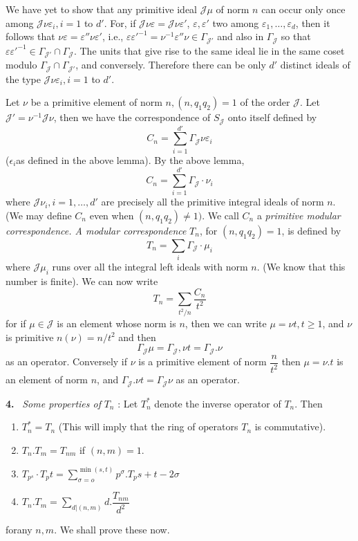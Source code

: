 We have yet to show that any primitive ideal $\mathcal{J} \mu$ of norm
$n$ can occur only once among $\mathcal{J} \nu \varepsilon_i, i = 1$
to $d'$. For, if $\mathcal{J} \nu \varepsilon = \mathcal{J} \nu
\varepsilon'$, $\varepsilon, \varepsilon'$ two among $\varepsilon_1,
\ldots,  \varepsilon_d$, then it follows that $\nu \varepsilon =
\varepsilon'' \nu \varepsilon'$, i.e., $\varepsilon \varepsilon'^{-1} =
\nu^{-1} \varepsilon'' \nu \in \Gamma_{\mathcal{J}'}$ and also in
$\Gamma_{\mathcal{J}}$ so that $\varepsilon \varepsilon'^{-1} \in
\Gamma_{\mathcal{J}'} \cap \Gamma_{\mathcal{J}}$. The units that give
rise to the same ideal lie in the same coset modulo $\Gamma_{\mathcal{J}} \cap
\Gamma_{\mathcal{J}'}$, and conversely. Therefore there can be only
$d'$ distinct ideals of the type $\mathcal{J} \nu \varepsilon_i, i =
1$ to $d'$. 

Let $\nu$ be a primitive element of norm $n, (n, q_1 q_2) = 1$ of the
order $\mathcal{J}$. Let $\mathcal{J}' = \nu^{-1} \mathcal{J} \nu$,
then we have the correspondence of $S_\mathcal{J}$ onto itself defined
by 
$$
C_n = \sum^{d'}_{i = 1} \Gamma_\mathcal{J} \nu \varepsilon_i
$$
($\epsilon_i$\pageoriginale as defined in the above lemma). By the above lemma,
$$
C_n = \sum^{d'}_{i = 1} \Gamma_\mathcal{J} \cdot \nu_i
$$
where $\mathcal{J} \nu_i, i=1, \ldots,  d'$ are precisely all the
primitive integral ideals of norm $n$. (We may define $C_n$ even when
$(n, q_1 q_2) \neq 1)$. We call $C_n$ a\textit{ primitive modular
  correspondence. A modular correspondence} $T_n$, for $(n, q_1 q_2) =
1$, is defined by 
$$
T_n = \sum_{i} \Gamma_{\mathcal{J}} \cdot \mu_i
$$
where $\mathcal{J} \mu_i$ runs over all the integral left ideals with
norm $n$. (We know that this number is finite). We can now write 
$$
T_n = \sum_{t^2 / n} \frac{C_n}{t^2}
$$
for if $\mu \in \mathcal{J} $ is an element whose norm is $n$, then we
can write $\mu = \nu t, t \ge 1$, and $\nu$ is primitive $n (\nu) = n/
t^2$ and then  
$$
\Gamma_{\mathcal{J}} \mu = \Gamma_{\mathcal{J}}, \nu t = \Gamma_{\mathcal{J}}. \nu
$$
as an operator. Conversely if $\nu$ is a primitive element of norm
$\dfrac{n}{t^2}$ then $\mu = \nu.  t$ is an element of norm $n$, and
$\Gamma_\mathcal{J}. \nu t = \Gamma_\mathcal{J} \nu $ as an operator. 

\textbf{4.} ~\textit{Some properties of} $T_n$ : Let $T_n ^*$ denote the
inverse operator of $T_n$. Then 
\begin{enumerate}[1)]
\item $T_n ^* = T_n$
  (This will imply that the ring of operators $T_n$ is commutative).
\item $T_n.  T_m = T_{nm}$ if $(n, m) = 1$.
\item $T_{p^s}\cdot T_p t = \sum\limits^{\min (s, t)}_{\sigma = o}
  p^\sigma. T_p s + t - 2 \sigma$ 
\item $T_n.  T_m = \sum_{d | (n, m)} d. \dfrac{T_{nm}}{d^2}$
\end{enumerate}
for\pageoriginale any $n, m$. We shall prove these now.


